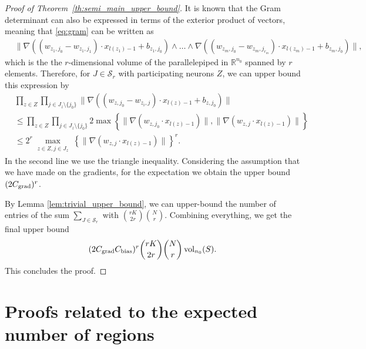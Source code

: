 \documentclass{article}
\theoremstyle{definition}
\newcommand{\cbias}{C_{\text{\normalfont bias}}}
\newcommand{\cgrad}{C_{\text{\normalfont grad}}}
\newcommand{\nin}{n_0}
\newcommand{\vol}{\operatorname{vol}}
\begin{document}
\begin{proof}[Proof of Theorem~\ref{th:semi_main_upper_bound}]
    It is known that the Gram determinant can also be expressed in terms of the exterior product of vectors,  meaning that \eqref{eq:gram} can be written as 
    \begin{align*}
        &  \| \nabla((w_{z_1, j_0} - w_{z_1, j_1}) \cdot x_{l(z_1)-1} + b_{z_1, j_0}) \land \dots \land \nabla((w_{z_m, j_0} - w_{z_m, j_{r_m}}) \cdot x_{l(z_m)-1} + b_{z_m, j_0}) \|, 
    \end{align*}
    which is the the $r$-dimensional volume of the parallelepiped in $\mathbb{R}^{\nin}$ spanned by $r$ elements. 
    Therefore, for $ J\in\mathcal{S}_r$ with participating neurons $Z$, we can upper bound this expression by \citep[see][]{GOVER201028} 
    \begin{align*}
        &\prod\limits_{z \in {Z}} \prod\limits_{j \in J_z \setminus \{j_0\}} \|\nabla ((w_{z, j_0} - w_{z_i, j}) \cdot x_{l(z)-1} + b_{z, j_0}) \|\\
        &\leq \prod\limits_{z \in  {Z}} \prod\limits_{j \in J_z \setminus \{j_0\}} 2 \max \left\{ \|\nabla (w_{z, j_0} \cdot x_{l(z)-1}) \|,  \|\nabla (w_{z, j} \cdot x_{l(z)-1}) \| \right\}\\
        &\leq
        2^r \max_{\substack{ z \in  {Z}, j \in J_z}} \left\{ \|\nabla (w_{z, j} \cdot x_{l(z)-1}) \|\right\}^{r}.
    \end{align*}
    In the second line we use the triangle inequality. Considering the assumption that we have made on the gradients, for the expectation we obtain the upper bound $(2 \cgrad)^r$. 
    
    By Lemma \ref{lem:trivial_upper_bound}, we can upper-bound the number of entries of the sum $\sum_{J \in \mathcal{S}_r}$ with $\binom{rK}{2r} \binom{N}{r}$. Combining everything, we get the final upper bound
    \begin{align*}
        (2 \cgrad \cbias)^r \binom{rK}{2r} \binom{N}{r} \vol_{\nin}(S).
    \end{align*}
    This concludes the proof. 
\end{proof}

\section{Proofs related to the expected number of regions}
\label{app:expected_number}
\end{document}

